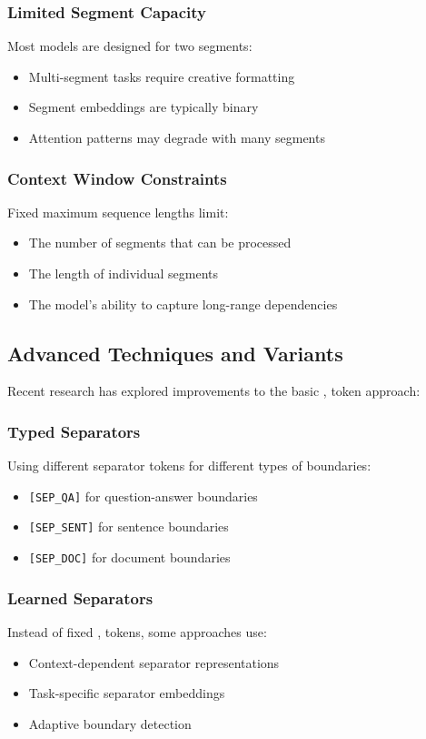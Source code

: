 \subsubsection{Limited Segment Capacity}
Most models are designed for two segments:
\begin{itemize}
\item Multi-segment tasks require creative formatting
\item Segment embeddings are typically binary
\item Attention patterns may degrade with many segments
\end{itemize}

\subsubsection{Context Window Constraints}
Fixed maximum sequence lengths limit:
\begin{itemize}
\item The number of segments that can be processed
\item The length of individual segments
\item The model's ability to capture long-range dependencies
\end{itemize}

\subsection{Advanced Techniques and Variants}

Recent research has explored improvements to the basic \sep{} token approach:

\subsubsection{Typed Separators}
Using different separator tokens for different types of boundaries:
\begin{itemize}
\item \texttt{[SEP\_QA]} for question-answer boundaries
\item \texttt{[SEP\_SENT]} for sentence boundaries
\item \texttt{[SEP\_DOC]} for document boundaries
\end{itemize}

\subsubsection{Learned Separators}
Instead of fixed \sep{} tokens, some approaches use:
\begin{itemize}
\item Context-dependent separator representations
\item Task-specific separator embeddings
\item Adaptive boundary detection
\end{itemize}

